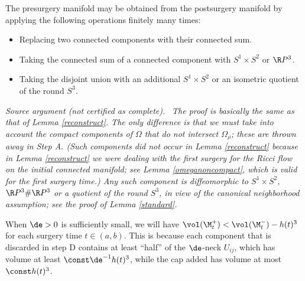 \begin{lemma}
  \label{lem:kl-performing-surgery-continuing-flows-rigidity-ricci-flow-surgery}
 \label{reconstruct2}
The presurgery manifold may be obtained
from the postsurgery manifold by applying the following
operations finitely many times:

\begin{itemize}
\item Replacing two connected components with their connected sum.
\item Taking the connected sum of a connected component
with  $S^1\times S^2$ or $\R P^3$.
\item Taking the disjoint union with an additional
$S^1 \times S^2$ or an isometric quotient of the round $S^3$.
\end{itemize}
\end{lemma}
\par\medskip\noindent\textit{Source argument (not certified as complete).}\ \begingroup\itshape
The proof is basically the same as that of Lemma \ref{reconstruct}. The only
difference is that we must take
into account the compact components of $\Omega$ that do not intersect
$\Omega_\rho$; these are thrown away in Step A.
(Such components did not occur in Lemma \ref{reconstruct} because
in Lemma \ref{reconstruct} we were dealing with the first surgery for
the Ricci flow on the initial connected manifold;
see Lemma \ref{omeganoncompact}, which is valid for the first surgery time.)
Any such component is
diffeomorphic to
$S^1 \times S^2$, $\R P^3 \# \R P^3$ or
a quotient of the round $S^3$, in view of the canonical
neighborhood assumption; see the proof of Lemma \ref{standard}.
\endgroup\par\medskip

\begin{remark}
  \label{rem:kl-performing-surgery-continuing-flows-structural-remark-ricci-flow-surgery}

\label{volumelossremark}
When $\de>0$ is sufficiently small, we will have
$\vol(\M_t^+)<\vol(\M_t^-)-h(t)^3$
for each surgery time $t\in (a,b)$.
This is because each component that is discarded in step D contains
at least
``half'' of the $\de$-neck $U_{ij}$, which has volume at least $\const \de^{-1}
h(t)^3$,
while the cap added has volume at most $\const h(t)^3$.
\end{remark}

